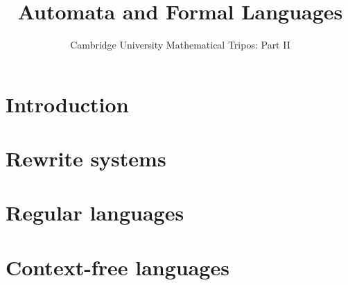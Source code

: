 \documentclass{article}
\title{Automata and Formal Languages}
\author{Cambridge University Mathematical Tripos: Part II}
\begin{document}
\maketitle

\tableofcontentsnewpage{}

\section{Introduction}

\section{Rewrite systems}

\section{Regular languages}

\section{Context-free languages}

\end{document}

